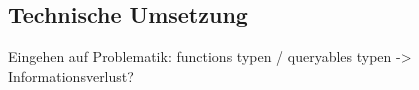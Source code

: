 \subsection{Technische Umsetzung}
Eingehen auf Problematik: functions typen / queryables typen -> Informationsverlust?
